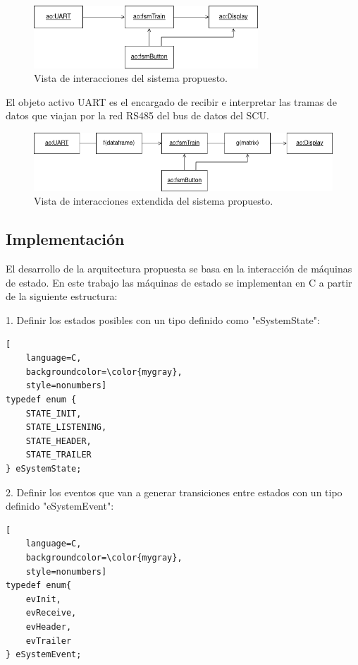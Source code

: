 \begin{figure}[ht]
	\centering
	\includegraphics[width=0.75\textwidth]{./Figures/diagVistaDisenho.png}
	\caption{Vista de interacciones del sistema propuesto.}
	\label{fig:diagVistaDisenho}
\end{figure}

El objeto activo UART es el encargado de recibir e interpretar las tramas de datos que viajan por la red RS485 del bus de datos del SCU.

\begin{figure}[ht]
	\centering
	\includegraphics[width=1\textwidth]{./Figures/diagVistaDisenhoExtendida.png}
	\caption{Vista de interacciones extendida del sistema propuesto.}
	\label{fig:diagVistaDisenhoExtendida}
\end{figure}

\pagebreak
\subsection{Implementación}

El desarrollo de la arquitectura propuesta se basa en la interacción de máquinas de estado.
En este trabajo las máquinas de estado se implementan en C a partir de la siguiente estructura:

1. Definir los estados posibles con un tipo definido como "eSystemState":

\begin{lstlisting}[
	language=C, 
	backgroundcolor=\color{mygray},
	style=nonumbers]
typedef enum {
	STATE_INIT,
	STATE_LISTENING,
	STATE_HEADER,
	STATE_TRAILER
} eSystemState;
\end{lstlisting}

2. Definir los eventos que van a generar transiciones entre estados con un tipo definido "eSystemEvent":

\begin{lstlisting}[
	language=C, 
	backgroundcolor=\color{mygray},
	style=nonumbers]
typedef enum{
	evInit,
	evReceive,
	evHeader,
	evTrailer
} eSystemEvent;
\end{lstlisting}

